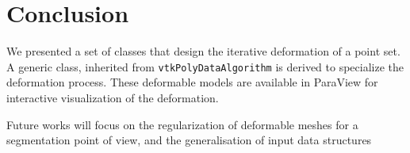 \documentclass{InsightArticle}
\begin{document}
\section{Conclusion}
%
We presented a set of classes that design the iterative deformation of a point
set. A generic class, inherited from \verb!vtkPolyDataAlgorithm! is derived to
specialize the deformation process. These deformable models are available in 
ParaView for interactive visualization of the deformation.

Future works will focus on the regularization of deformable meshes for a 
segmentation point of view, and the generalisation of input data structures
%
\appendix

%
%



\end{document}
